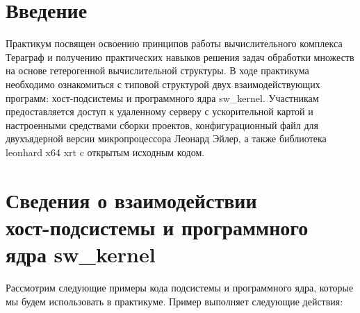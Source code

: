 \setcounter{page}{2}

\chapter*{Введение}

Практикум посвящен освоению принципов работы вычислительного комплекса 
Тераграф и получению практических навыков решения задач обработки 
множеств на основе гетерогенной вычислительной структуры. В ходе 
практикума необходимо ознакомиться с типовой структурой двух 
взаимодействующих программ: хост-подсистемы и программного ядра 
sw\_kernel. Участникам предоставляется доступ к удаленному серверу с 
ускорительной картой и настроенными средствами сборки проектов, 
конфигурационный файл для двухъядерной версии микропроцессора Леонард 
Эйлер, а также библиотека leonhard x64 xrt c открытым исходным кодом.

\chapter{Сведения о взаимодействии \\хост-подсистемы и программного ядра sw\_kernel}
Рассмотрим следующие примеры кода подсистемы и программного ядра, которые мы будем использовать в практикуме. Пример выполняет следующие действия:

